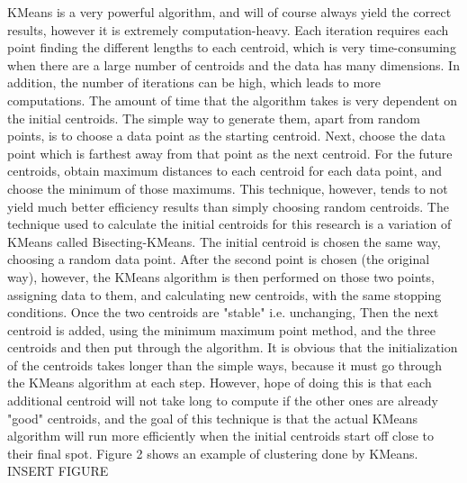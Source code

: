 \documentclass[journal]{IEEEtran}
\begin{document}
KMeans is a very powerful algorithm, and will of course always yield the correct results, however it is extremely computation-heavy. Each iteration requires each point finding the different lengths to each centroid, which is very time-consuming when there are a large number of centroids and the data has many dimensions. In addition, the number of iterations can be high, which leads to more computations. The amount of time that the algorithm takes is very dependent on the initial centroids. The simple way to generate them, apart from random points, is to choose a data point as the starting centroid. Next, choose the data point which is farthest away from that point as the next centroid. For the future centroids, obtain maximum distances to each centroid for each data point, and choose the minimum of those maximums. This technique, however, tends to not yield much better efficiency results than simply choosing random centroids. The technique used to calculate the initial centroids for this research is a variation of KMeans called Bisecting-KMeans. The initial centroid is chosen the same way, choosing a random data point. After the second point is chosen (the original way), however, the KMeans algorithm is then performed on those two points, assigning data to them, and calculating new centroids, with the same stopping conditions. Once the two centroids are "stable" i.e. unchanging, Then the next centroid is added, using the minimum maximum point method, and the three centroids and then put through the algorithm. It is obvious that the initialization of the centroids takes longer than the simple ways, because it must go through the KMeans algorithm at each step. However, hope of doing this is that each additional centroid will not take long to compute if the other ones are already "good" centroids, and the goal of this technique is that the actual KMeans algorithm will run more efficiently when the initial centroids start off close to their final spot. Figure 2 shows an example of clustering done by KMeans. INSERT FIGURE

\end{document}
